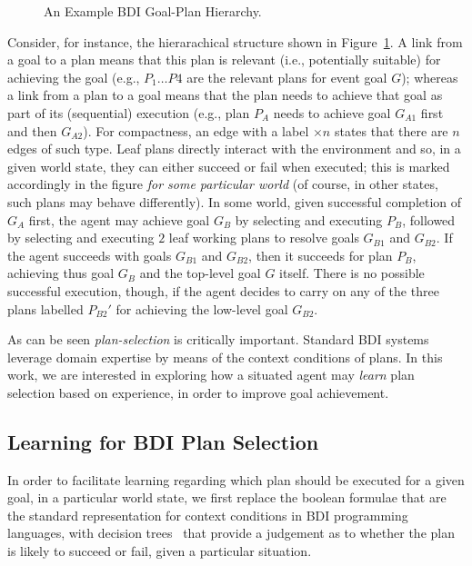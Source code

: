 \begin{figure}[t]
\begin{center}

\end{center}
\caption{An Example BDI Goal-Plan Hierarchy.}
\label{fig:T3}
\end{figure}

Consider, for instance, the hierarachical structure shown in Figure~\ref{fig:T3}.
A link from a goal to a plan means that this plan is relevant (i.e., potentially
suitable) for achieving the goal (e.g., $P_1 \ldots P4$ are the relevant plans
for event goal $G$); whereas a link from a plan to a goal means that the plan
needs to achieve that goal as part of its (sequential) execution (e.g., plan
$P_A$ needs to achieve goal $G_{A1}$ first and then $G_{A2}$).
For compactness, an edge with a label $\times n$ states that there are $n$ edges
of such type.
Leaf plans directly interact with the environment and so, in a given world state,
they can either succeed or fail when executed; this is marked accordingly in the
figure \emph{for some particular world} (of course, in other states, such plans
may behave differently).
In some world, given successful completion of $G_A$ first, the agent may achieve
goal $G_B$ by selecting and executing $P_B$, followed by selecting and executing
$2$ leaf working plans to resolve goals $G_{B1}$ and $G_{B2}$. If the agent
succeeds with goals $G_{B1}$ and $G_{B2}$, then it succeeds for plan $P_B$,
achieving thus goal $G_B$ and the top-level goal $G$ itself. There is no possible
successful execution, though, if the agent decides to carry on any of the three
plans labelled $P_{B2}'$ for achieving the low-level goal $G_{B2}$.


As can be seen \textit{plan-selection} is critically important.
Standard BDI systems leverage domain
expertise by means of the context conditions of plans.
In this work, we are interested in exploring how a situated agent may
\emph{learn} plan selection based on experience, in order to improve goal
achievement. 


\subsection{Learning for BDI Plan Selection} \label{subsec:bdi_learning}
In order to facilitate learning regarding which plan should be
executed for a given goal, in a particular world state, we first replace the
boolean formulae that are the standard representation for context
conditions in BDI programming languages, with decision
trees~\cite{Mitchell97:ML} that provide a judgement as to whether the
plan is likely to succeed or fail, given a particular situation. 

